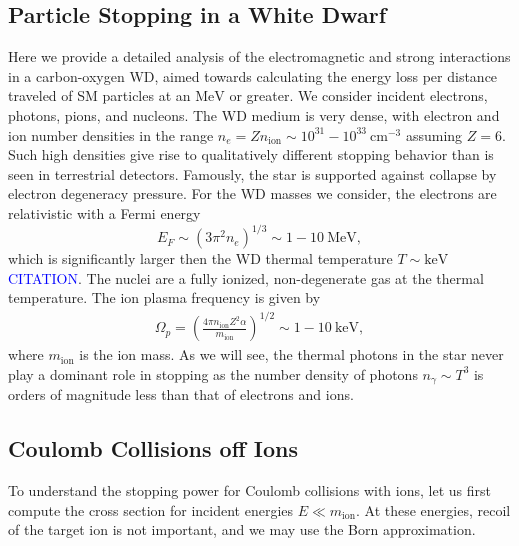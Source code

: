 \documentclass[twocolumn, preprintnumbers,amsmath,amssymb,prd, superscriptaddress]{revtex4}
\newcommand{\MeV}{\text{MeV}}
\newcommand{\keV}{\text{keV}}
\newcommand{\cm}{\text{cm}}
\def\r{\right)}
\def\l{\left(}
\begin{document}
\begin{appendices}

\section{Particle Stopping in a White Dwarf}
\label{sec:wdpdg}
Here we provide a detailed analysis of the electromagnetic and strong interactions in a carbon-oxygen WD, aimed towards calculating the energy loss per distance traveled of SM particles at an $\text{MeV}$ or greater.
We consider incident electrons, photons, pions, and nucleons.
The WD medium is very dense, with electron and ion number densities in the range $n_e = Z n_\text{ion} \sim 10^{31} - 10^{33} ~\cm^{-3}$ assuming $Z=6$.
Such high densities give rise to qualitatively different stopping behavior than is seen in terrestrial detectors.
Famously, the star is supported against collapse by electron degeneracy pressure.
For the WD masses we consider, the electrons are relativistic with a Fermi energy
\begin{equation}
  E_F \sim (3 \pi^2 n_e)^{1/3} \sim 1 -10 ~\MeV,
\end{equation}
which is significantly larger then the WD thermal temperature $T \sim \keV$ \textcolor{blue}{CITATION}.
The nuclei are a fully ionized, non-degenerate gas at the thermal temperature.
The ion plasma frequency is given by
\begin{align}
\Omega_p = \l \frac{4 \pi n_\text{ion} Z^2 \alpha}{m_\text{ion}}\r^{1/2} \sim 1 - 10~\text{keV},
\end{align}
where $m_\text{ion}$ is the ion mass.
As we will see, the thermal photons in the star never play a dominant role in stopping as the number density of photons $n_\gamma \sim T^3$ is orders of magnitude less than that of electrons and ions.

\subsection{Coulomb Collisions off Ions}
To understand the stopping power for Coulomb collisions with ions, let us first compute the cross section for incident energies $E \ll m_\text{ion}$.
At these energies, recoil of the target ion is not important, and we may use the Born approximation.


\end{appendices}
\end{document}

